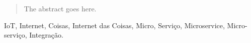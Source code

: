 \documentclass[journal]{IEEEtran}
\begin{document}







\maketitle

\begin{abstract}
The abstract goes here.
\end{abstract}

\begin{IEEEkeywords}
IoT, Internet, Coisas, Internet das Coisas, Micro, Serviço, Microservice, Micro-serviço, Integração.
\end{IEEEkeywords}






%
\IEEEpeerreviewmaketitle
\end{document}
